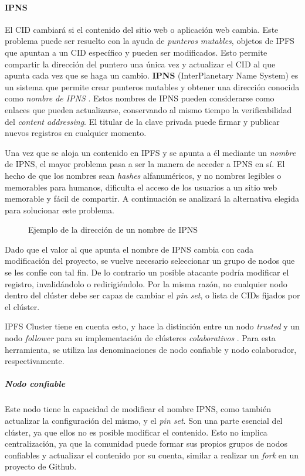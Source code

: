 \paragraph{IPNS} El CID cambiará si el contenido del sitio web o aplicación web cambia. Este problema puede ser resuelto con la ayuda de \textit{punteros mutables}, objetos de IPFS que apuntan a un CID específico y pueden ser modificados. Esto permite compartir la dirección del puntero una única vez y actualizar el CID al que apunta cada vez que se haga un cambio. \textbf{IPNS} (InterPlanetary Name System) es un sistema que permite crear  punteros mutables y obtener una dirección conocida como \textit{nombre de IPNS} \cite{ipns}. Estos nombres de IPNS pueden considerarse como enlaces que pueden actualizarse, conservando al mismo tiempo la verificabilidad del \textit{content addressing}. El titular de la clave privada puede firmar y publicar nuevos registros en cualquier momento.

Una vez que se aloja un contenido en IPFS y se apunta a él mediante un \textit{nombre} de IPNS, el mayor problema pasa a ser la manera de acceder a IPNS en sí. El hecho de que los nombres sean \textit{hashes} alfanuméricos, y no nombres legibles o memorables para humanos, dificulta el acceso de los usuarios a un sitio web memorable y fácil de compartir. A continuación se analizará la alternativa elegida para solucionar este problema.

\begin{figure}[h]
\centering
{}
\caption{Ejemplo de la dirección de un nombre de IPNS}
\end{figure}

Dado que el valor al que apunta el nombre de IPNS cambia con cada modificación del proyecto, se vuelve necesario seleccionar un grupo de nodos que se les confíe con tal fin. De lo contrario un posible atacante podría modificar el registro, invalidándolo o redirigiéndolo. Por la misma razón, no cualquier nodo dentro del clúster debe ser capaz de cambiar el \textit{pin set}, o lista de CIDs fijados por el clúster.

IPFS Cluster tiene en cuenta esto, y hace la distinción entre un nodo \textit{trusted} y un nodo \textit{follower} para su implementación de clústeres \textit{colaborativos} \cite{ipfs-cluster-collaborative}. Para esta herramienta, se utiliza las denominaciones de nodo confiable y nodo colaborador, respectivamente.

\subparagraph{Nodo confiable} Este nodo tiene la capacidad de modificar el nombre IPNS, como también actualizar la configuración del mismo, y el \textit{pin set}. Son una parte esencial del clúster, ya que ellos no es posible modificar el contenido. Esto no implica centralización, ya que la comunidad puede formar sus propios grupos de nodos confiables y actualizar el contenido por su cuenta, similar a realizar un \textit{fork} en un proyecto de Github.

